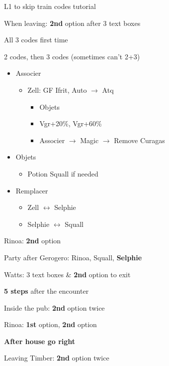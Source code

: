L1 to skip train codes tutorial

When leaving: \textbf{2nd} option after 3 text boxes

All 3 codes first time

2 codes, then 3 codes (sometimes can't 2+3)\vfill

\begin{menu}
	\begin{itemize}
		\item Associer
			\begin{itemize}
				\item Zell: GF Ifrit, Auto $\rightarrow$ Atq
					\begin{itemize}
						\item Objets
						\item Vgr+20\%, Vgr+60\%
						\item Associer $\rightarrow$ Magic $\rightarrow$ Remove Curagas
					\end{itemize}
			\end{itemize}
		\item Objets
			\begin{itemize}
				\item Potion Squall if needed
			\end{itemize}
		\item Remplacer
			\begin{itemize}
				\item Zell $\leftrightarrow$ Selphie
				\item Selphie $\leftrightarrow$ Squall
			\end{itemize}
	\end{itemize}
\end{menu}

Rinoa: \textbf{2nd} option

Party after Gerogero: Rinoa, Squall, \textbf{Selphie}

Watts: 3 text boxes \& \textbf{2nd} option to exit

\textbf{5 steps} after the encounter

Inside the pub: \textbf{2nd} option twice

Rinoa: \textbf{1st} option, \textbf{2nd} option

\textbf{After house go right}

Leaving Timber: \textbf{2nd} option twice

